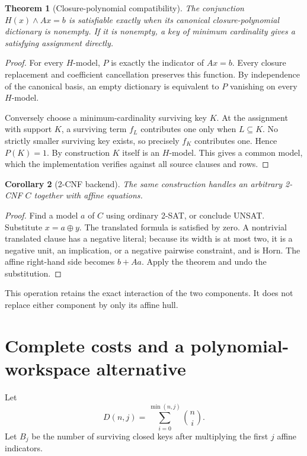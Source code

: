 \documentclass[11pt]{article}
\newtheorem{theorem}{Theorem}
\newtheorem{corollary}[theorem]{Corollary}
\begin{document}
\begin{theorem}[Closure-polynomial compatibility]
The conjunction \(H(x)\land Ax=b\) is satisfiable exactly when its
canonical closure-polynomial dictionary is nonempty.
If it is nonempty, a key of minimum cardinality gives a satisfying
assignment directly.
\end{theorem}
\begin{proof}
For every \(H\)-model, \(P\) is exactly the indicator of \(Ax=b\).
Every closure replacement and coefficient cancellation preserves this
function. By independence of the canonical basis, an empty dictionary
is equivalent to \(P\) vanishing on every \(H\)-model.

Conversely choose a minimum-cardinality surviving key \(K\).
At the assignment with support \(K\), a surviving term \(f_L\) contributes
one only when \(L\subseteq K\). No strictly smaller surviving key exists,
so precisely \(f_K\) contributes one. Hence \(P(K)=1\).
By construction \(K\) itself is an \(H\)-model. This gives a common model,
which the implementation verifies against all source clauses and rows.
\end{proof}

\begin{corollary}[2-CNF backend]
The same construction handles an arbitrary 2-CNF \(C\) together with
affine equations.
\end{corollary}
\begin{proof}
Find a model \(a\) of \(C\) using ordinary 2-SAT, or conclude UNSAT.
Substitute \(x=a\oplus y\). The translated formula is satisfied by zero.
A nontrivial translated clause has a negative literal; because its width
is at most two, it is a negative unit, an implication, or a negative
pairwise constraint, and is Horn. The affine right-hand side becomes
\(b+Aa\). Apply the theorem and undo the substitution.
\end{proof}

This operation retains the exact interaction of the two components.
It does not replace either component by only its affine hull.

\section{Complete costs and a polynomial-workspace alternative}
Let
\[
 D(n,j)=\sum_{i=0}^{\min(n,j)}\binom ni.
\]
Let \(B_j\) be the number of surviving closed keys after multiplying
the first \(j\) affine indicators.
\end{document}
